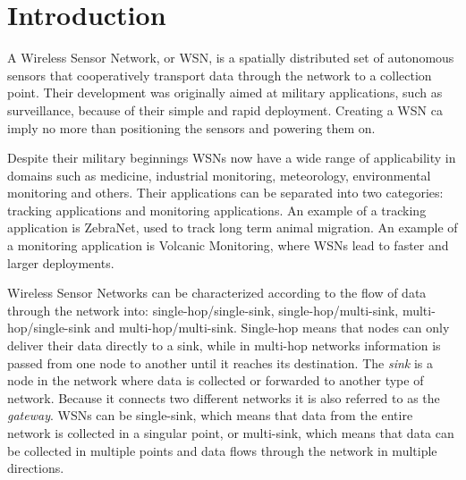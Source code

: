 
\chapter{Introduction}

A Wireless Sensor Network, or WSN, is a spatially distributed set of autonomous
sensors that cooperatively transport data through the network to a collection
point. Their development was originally aimed at military applications, such as
surveillance, because of their simple and rapid deployment. Creating a WSN ca
imply no more than positioning the sensors and powering them on.

Despite their military beginnings WSNs now have a wide range of applicability
in domains such as medicine, industrial monitoring, meteorology, environmental
monitoring and others. Their applications can be separated into two categories:
tracking applications and monitoring applications. An example of a tracking
application is ZebraNet\cite{zhang2004hardware}, used to track long term animal
migration. An example of a monitoring application is Volcanic
Monitoring\cite{werner2006deploying}, where WSNs lead to faster and larger
deployments.

Wireless Sensor Networks can be characterized according to the flow of data
through the network into: single-hop/single-sink, single-hop/multi-sink,
multi-hop/single-sink and multi-hop/multi-sink. Single-hop means that nodes can
only deliver their data directly to a sink, while in multi-hop networks
information is passed from one node to another until it reaches its
destination. The \emph{sink} is a node in the network where data is collected
or forwarded to another type of network. Because it connects two different
networks it is also referred to as the \emph{gateway}. WSNs can be single-sink,
which means that data from the entire network is collected in a singular point,
or multi-sink, which means that data can be collected in multiple points and
data flows through the network in multiple directions.

